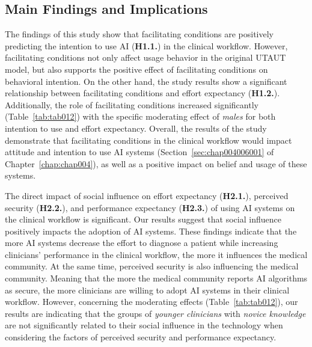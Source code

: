 \subsection{Main Findings and Implications}
\label{chap:app002005001}

The findings of this study show that facilitating conditions are positively predicting the intention to use \ac{AI} ({\bf H1.1.}) in the clinical workflow.
However, facilitating conditions not only affect usage behavior in the original UTAUT model, but also supports the positive effect of facilitating conditions on behavioral intention.
On the other hand, the study results show a significant relationship between facilitating conditions and effort expectancy ({\bf H1.2.}).
Additionally, the role of facilitating conditions increased significantly (Table~\ref{tab:tab012}) with the specific moderating effect of {\it males} for both intention to use and effort expectancy.
Overall, the results of the study demonstrate that facilitating conditions in the clinical workflow would impact attitude and intention to use \ac{AI} systems (Section~\ref{sec:chap004006001} of Chapter~\ref{chap:chap004}), as well as a positive impact on belief and usage of these systems.

The direct impact of social influence on effort expectancy ({\bf H2.1.}), perceived security ({\bf H2.2.}), and performance expectancy ({\bf H2.3.}) of using \ac{AI} systems on the clinical workflow is significant.
Our results suggest that social influence positively impacts the adoption of \ac{AI} systems.
These findings indicate that the more \ac{AI} systems decrease the effort to diagnose a patient while increasing clinicians' performance in the clinical workflow, the more it influences the medical community.
At the same time, perceived security is also influencing the medical community.
Meaning that the more the medical community reports \ac{AI} algorithms as secure, the more clinicians are willing to adopt \ac{AI} systems in their clinical workflow.
However, concerning the moderating effects (Table~\ref{tab:tab012}), our results are indicating that the groups of {\it younger clinicians} with {\it novice knowledge} are not significantly related to their social influence in the technology when considering the factors of perceived security and performance expectancy.

